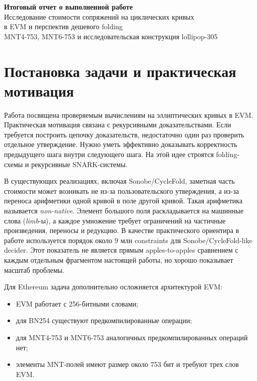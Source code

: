 \documentclass[12pt,a4paper]{article}
\begin{document}
\begin{center}
    {\Large\bfseries Итоговый отчет о выполненной работе}\\[0.4em]
    {\large Исследование стоимости сопряжений на циклических кривых\\
    в EVM и перспектив дешевого folding}\\[0.4em]
    {\normalsize MNT4-753, MNT6-753 и исследовательская конструкция lollipop-305}
\end{center}

\tableofcontents
\vspace{0.4em}

\section{Постановка задачи и практическая мотивация}

Работа посвящена проверяемым вычислениям на эллиптических кривых в EVM.
Практическая мотивация связана с рекурсивными доказательствами. Если требуется
построить цепочку доказательств, недостаточно один раз проверить отдельное
утверждение. Нужно уметь эффективно доказывать корректность предыдущего шага
внутри следующего шага. На этой идее строятся folding-схемы и рекурсивные
SNARK-системы.

В существующих реализациях, включая Sonobe/CycleFold, заметная часть стоимости
может возникать не из-за пользовательского утверждения, а из-за переноса
арифметики одной кривой в поле другой кривой. Такая арифметика называется
\emph{non-native}. Элемент большого поля раскладывается на машинные слова
(\emph{limb}-ы), а каждое умножение требует ограничений на частичные
произведения, переносы и редукцию. В качестве практического ориентира в работе
используется порядок около $9$ млн constraints для Sonobe/CycleFold-like
decider. Этот показатель не является прямым apples-to-apples сравнением с
каждым отдельным фрагментом настоящей работы, но хорошо показывает масштаб
проблемы.

Для Ethereum задача дополнительно осложняется архитектурой EVM:
\begin{itemize}
    \item EVM работает с 256-битными словами;
    \item для BN254 существуют предкомпилированные операции;
    \item для MNT4-753 и MNT6-753 аналогичных предкомпилированных операций нет;
    \item элементы MNT-полей имеют размер около 753 бит и требуют трех слов EVM.
\end{itemize}
\end{document}
